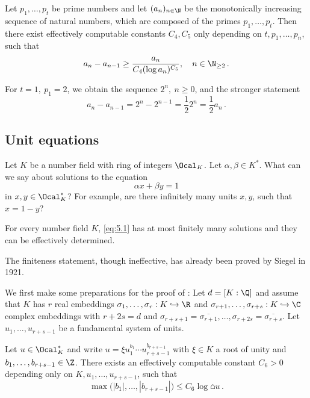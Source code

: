 \begin{cor}
	Let \( p_1, \dotsc, p_t \) be prime numbers and let \( (a_n)_{n \in \N} \) be the monotonically increasing sequence of natural numbers, which are composed of the primes \( p_1, \dotsc, p_t \).
	Then there exist effectively computable constants \( C_4, C_5 \) only depending on \( t, p_1, \dotsc, p_n \), such that
	\[ a_n - a_{n-1} \geq \frac{a_n}{C_4 (\log a_n)^{C_5}}, \quad n \in \N_{\geq 2} \,. \]
\end{cor}

\begin{exmp*}
	For \( t=1,\ p_1 = 2 \), we obtain the sequence \( 2^n,\ n \geq 0 \), and the stronger statement
	\[ a_n - a_{n-1} = 2^n - 2^{n-1} = \frac{1}{2} 2^n = \frac{1}{2} a_n \,. \]
\end{exmp*}


\subsection*{Unit equations}

Let \( K \) be a number field with ring of integers \( \Ocal_K \).
Let \( \alpha, \beta \in K^* \).
What can we say about solutions to the equation
\begin{equation}\label{eq:5.1}
	\alpha x + \beta y = 1
\end{equation}
in \( x,y \in \Ocal_K^* \)?
For example, are there infinitely many units \( x,y \), such that \( x = 1-y \)?

\begin{thm} \label{thm:5.5}
	For every number field \( K \), \eqref{eq:5.1} has at most finitely many solutions and they can be effectively determined.
\end{thm}

\begin{rem*}
	The finiteness statement, though ineffective, has already been proved by Siegel in 1921.
\end{rem*}

We first make some preparations for the proof of :
Let \( d = [K : \Q] \) and assume that \( K \) has \( r \) real embeddings \( \sigma_1, \dotsc, \sigma_r: K \hookrightarrow \R \) and \( \sigma_{r+1}, \dotsc, \sigma_{r+s}: K \hookrightarrow \C \) complex embeddings with \( r + 2s = d \) and \( \sigma_{r+s+1} = \overline{\sigma_{r+1}}, \dotsc, \sigma_{r+2s} = \overline{\sigma_{r+s}} \).
Let \( u_1, \dotsc, u_{r+s-1} \) be a fundamental system of units.

\begin{lem}
	Let \( u \in \Ocal_K^* \) and write \( u = \xi u_1^{b_1} \dotsm u_{r+s-1}^{b_{r+s-1}} \) with \( \xi \in K \) a root of unity and \( b_1, \dotsc, b_{r+s-1} \in \Z \).
	There exists an effectively computable constant \( C_6 > 0 \) depending only on \( K, u_1, \dotsc, u_{r+s-1} \), such that
	\[ \max \big( |b_1|, \dotsc, |b_{r+s-1}| \big) \leq C_6 \log \house{u} \,. \]
\end{lem}